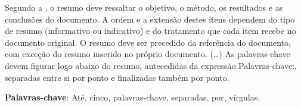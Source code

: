 \documentclass[12pt,
openright, 
oneside, %
a4paper,    %
brazil]{facom-ufu-abntex2}
\begin{document}





\begin{resumo}


Segundo a , o resumo deve ressaltar o
objetivo, o método, os resultados e as conclusões do documento. A ordem e a extensão
destes itens dependem do tipo de resumo (informativo ou indicativo) e do
tratamento que cada item recebe no documento original. O resumo deve ser
precedido da referência do documento, com exceção do resumo inserido no
próprio documento. (\ldots) As palavras-chave devem figurar logo abaixo do
resumo, antecedidas da expressão Palavras-chave:, separadas entre si por
ponto e finalizadas também por ponto.

\vspace{\onelineskip}
  
\noindent
\textbf{Palavras-chave}: Até, cinco, palavras-chave, separadas, por, vírgulas.

\end{resumo}





\end{document}
